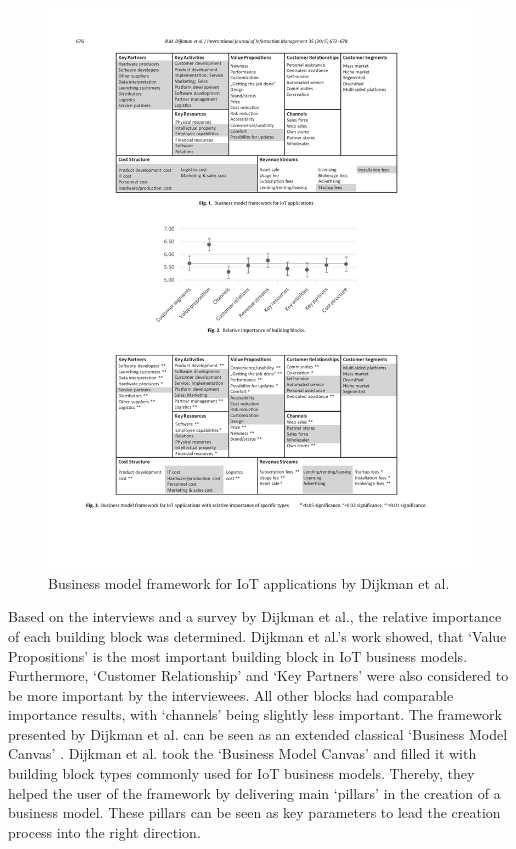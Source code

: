 		\begin{figure}[ht]
			\begin{center}
		    \includegraphics[scale=1.1]{Talk11/iot_canvas_dijkman.pdf}
		    \end{center}
		    \caption{Business model framework for IoT applications by Dijkman et al. \cite{dijkman}}
		    \label{fig:bm_dijkman}
		\end{figure}
		Based on the interviews and a survey by Dijkman et al., the relative importance of each building block was determined. Dijkman et al.'s work showed, that `Value Propositions' is the most important building block in IoT business models. Furthermore, `Customer Relationship' and `Key Partners' were also considered to be more important by the interviewees. All other blocks had comparable importance results, with `channels' being slightly less important. The framework presented by Dijkman et al. can be seen as an extended classical `Business Model Canvas' \cite{bmc}. Dijkman et al. took the `Business Model Canvas' and filled it with building block types commonly used for IoT business models. Thereby, they helped the user of the framework by delivering main `pillars' in the creation of a business model. These pillars can be seen as key parameters to lead the creation process into the right direction. 
	\vspace{-2em}

